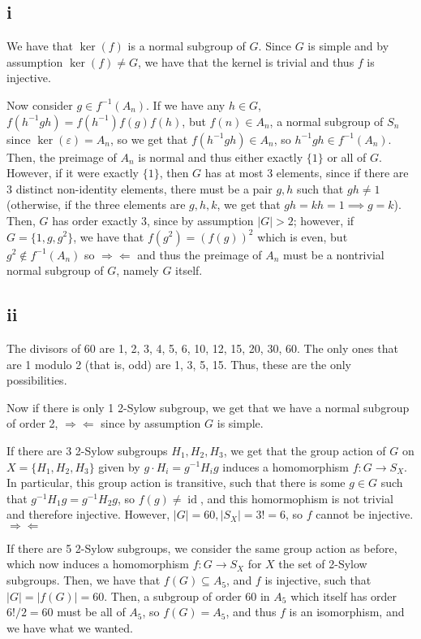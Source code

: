 \documentclass[12pt,letterpaper]{article}
\theoremstyle{definition}
\newcommand{\contra}{\Rightarrow\!\Leftarrow}
\DeclareMathOperator{\Id}{id}
\begin{document}
\subsection*{i}

We have that $\ker(f)$ is a normal subgroup of $G$. Since $G$ is simple and by assumption $\ker(f) \neq G$, we have that the kernel is trivial and thus $f$ is injective.

Now consider $g \in f^{-1}(A_{n})$. If we have any $h \in G$, $f(h^{-1}gh) = f(h^{-1})f(g)f(h)$, but $f(n) \in A_{n}$, a normal subgroup of $S_{n}$ since $\ker(\varepsilon) = A_{n}$, so we get that $f(h^{-1}gh) \in A_{n}$, so $h^{-1}gh \in f^{-1}(A_{n})$. Then, the preimage of $A_{n}$ is normal and thus either exactly $\{1\}$ or all of $G$. However, if it were exactly $\{1\}$, then $G$ has at most 3 elements, since if there are 3 distinct non-identity elements, there must be a pair $g,h$ such that $gh \neq 1$ (otherwise, if the three elements are $g,h,k$, we get that $gh = kh = 1\implies g = k$). Then, $G$ has order exactly $3$, since by assumption $|G| > 2$; however, if $G = \{1, g, g^{2}\}$, we have that $f(g^{2}) = (f(g))^{2}$ which is even, but $g^{2} \notin f^{-1}(A_{n})$ so $\contra$ and thus the preimage of $A_{n}$ must be a nontrivial normal subgroup of $G$, namely $G$ itself.

\subsection*{ii}

The divisors of 60 are 1, 2, 3, 4, 5, 6, 10, 12, 15, 20, 30, 60. The only ones that are 1 modulo 2 (that is, odd) are 1, 3, 5, 15. Thus, these are the only possibilities.

Now if there is only 1 2-Sylow subgroup, we get that we have a normal subgroup of order 2, $\contra$ since by assumption $G$ is simple.

If there are 3 2-Sylow subgroups $H_{1}, H_{2}, H_{3}$, we get that the group action of $G$ on $X = \{H_{1}, H_{2}, H_{3}\}$ given by $g \cdot H_{i} = g^{-1}H_{i}g$ induces a homomorphism $f: G \rightarrow S_{X}$. In particular, this group action is transitive, such that there is some $g \in G$ such that $g^{-1}H_{1}g = g^{-1}H_{2}g$, so $f(g) \neq \Id$, and this homormophism is not trivial and therefore injective. However, $|G| = 60, |S_{X}| = 3! = 6$, so $f$ cannot be injective. $\contra$

If there are 5 2-Sylow subgroups, we consider the same group action as before, which now induces a homomorphism $f: G \rightarrow S_{X}$ for $X$ the set of 2-Sylow subgroups. Then, we have that $f(G) \subseteq A_{5}$, and $f$ is injective, such that $|G| = |f(G)| = 60$. Then, a subgroup of order $60$ in $A_{5}$ which itself has order $6!/2 = 60$ must be all of $A_{5}$, so $f(G) = A_{5}$, and thus $f$ is an isomorphism, and we have what we wanted.
\end{document}
